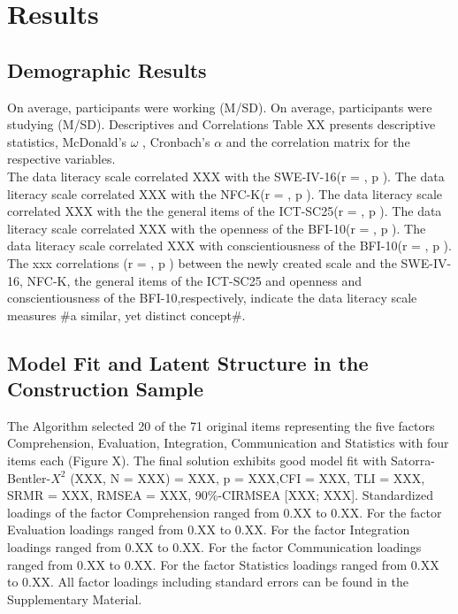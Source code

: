\documentclass[
  12pt,
  a4paper,
  twoside]{article}
\begin{document}
\section{Results}\label{results}

\subsection{Demographic Results}\label{demographic-results}

On average, participants were working (M/SD). On average, participants were studying (M/SD). Descriptives and Correlations
Table XX
presents descriptive statistics, McDonald's \(\omega\) ,
Cronbach's \(\alpha\) and the correlation matrix for the respective variables.\\
The data literacy scale correlated XXX with the SWE-IV-16(r = , p ). The data literacy scale correlated XXX with the NFC-K(r = , p ). The data literacy scale correlated XXX with the the general items of the ICT-SC25(r = , p ). The data literacy scale correlated XXX with the openness of the BFI-10(r = , p ). The data literacy scale correlated XXX with conscientiousness of the BFI-10(r = , p ). The xxx correlations (r = , p ) between the newly created scale and the SWE-IV-16, NFC-K, the general items of the ICT-SC25 and openness and conscientiousness of the BFI-10,respectively, indicate the data literacy scale measures \#a similar, yet distinct concept\#.

\subsection{Model Fit and Latent Structure in the Construction Sample}\label{model-fit-and-latent-structure-in-the-construction-sample}

The Algorithm selected 20 of the 71 original items representing the five factors Comprehension, Evaluation, Integration, Communication and Statistics with four items each (Figure X). The final solution exhibits good model fit with Satorra-Bentler-\(X^{2}\) (XXX, N = XXX) = XXX, p = XXX,CFI = XXX, TLI = XXX, SRMR = XXX, RMSEA = XXX, 90\%-CIRMSEA {[}XXX; XXX{]}.
Standardized loadings of the factor Comprehension ranged from 0.XX to 0.XX. For the factor Evaluation loadings ranged from 0.XX to 0.XX. For the factor Integration loadings ranged from 0.XX to 0.XX. For the factor Communication loadings ranged from 0.XX to 0.XX. For the factor Statistics loadings ranged from 0.XX to 0.XX.
All factor loadings including standard errors can be found in the Supplementary Material.
\end{document}
